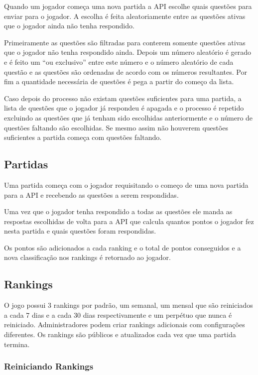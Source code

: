 Quando um jogador começa uma nova partida a API escolhe quais questões para enviar para o jogador. A escolha é feita aleatoriamente entre as questões ativas que o jogador ainda não tenha respondido. 

Primeiramente as questões são filtradas para conterem somente questões ativas que o jogador não tenha respondido ainda. Depois um número aleatório é gerado e é feito um “ou exclusivo” entre este número e o número aleatório de cada questão e as questões são ordenadas de acordo com os números resultantes. Por fim a quantidade necessária de questões é pega a partir do começo da lista.

Caso depois do processo não existam questões suficientes para uma partida, a lista de questões que o jogador já respondeu é apagada e o processo é repetido excluindo as questões que já tenham sido escolhidas anteriormente e o número de questões faltando são escolhidas. Se mesmo assim não houverem questões suficientes a partida começa com questões faltando.

\subsection{Partidas}
\label{subsec:partidas}

Uma partida começa com o jogador requisitando o começo de uma nova partida para a API e recebendo as questões a serem respondidas. 

Uma vez que o jogador tenha respondido a todas as questões ele manda as respostas escolhidas de volta para a API que calcula quantos pontos o jogador fez nesta partida e quais questões foram respondidas.

Os pontos são adicionados a cada ranking e o total de pontos conseguidos e a nova classificação nos rankings é retornado ao jogador.

\subsection{Rankings}
\label{subsec:rankings}

O jogo possui 3 rankings por padrão, um semanal, um mensal que são reiniciados a cada 7 dias e a cada 30 dias respectivamente e um perpétuo que nunca é reiniciado.     Administradores podem criar rankings adicionais com configurações diferentes. Os rankings são públicos e atualizados cada vez que uma partida termina.

\subsubsection{Reiniciando Rankings}
\label{subsubsec:reiniciando}

